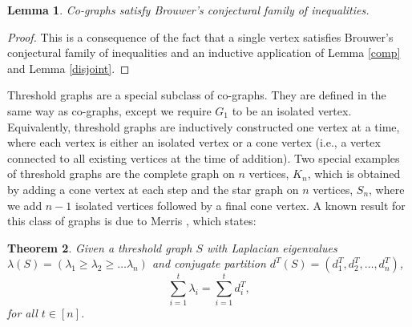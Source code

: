 \documentclass[11pt]{article}
\newtheorem{lm}{Lemma}
\newtheorem{thm}[lm]{Theorem}
\begin{document}
\begin{lm}
Co-graphs satisfy Brouwer's conjectural family of inequalities.
\end{lm}

\begin{proof}
This is a consequence of the fact that a single vertex satisfies Brouwer's conjectural family of inequalities and an inductive application of Lemma \ref{comp} and Lemma \ref{disjoint}.
\end{proof}



Threshold graphs are a special subclass of co-graphs. They are defined in the same way as co-graphs, except we require $G_1$ to be an isolated vertex. Equivalently, threshold graphs are inductively constructed one vertex at a time, where each vertex is either an isolated vertex or a cone vertex (i.e., a vertex connected to all existing vertices at the time of addition). Two special examples of threshold graphs are the complete graph on $n$ vertices, $K_n$, which is obtained by adding a cone vertex at each step and the star graph on $n$ vertices, $S_n$, where we add $n-1$ isolated vertices followed by a final cone vertex. A known result for this class of graphs is due to Merris \cite{M}, which states:

\begin{thm}
Given a threshold graph $S$ with Laplacian eigenvalues $\lambda(S) = \left( \lambda_1 \geq \lambda_2 \geq \ldots \lambda_n \right)$ and conjugate partition $d^T(S) = \left(d_1^T, d_2^T, \ldots, d_n^T \right)$,
$$\sum^{t}_{i=1} \lambda_i = \sum^{t}_{i=1} d^T_i,$$
for all $t \in [n]$.
\end{thm}
\end{document}
